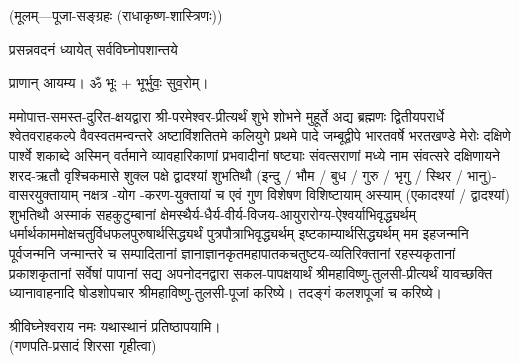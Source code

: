 
\centerline{\small{(मूलम्—पूजा-सङ्ग्रहः (राधाकृष्ण-शास्त्रिणः))}}




{प्रसन्नवदनं ध्यायेत् सर्वविघ्नोपशान्तये}
 
प्राणान् आयम्य। ॐ भूः + भूर्भुवः॒ सुव॒रोम्।


ममोपात्त-समस्त-दुरित-क्षयद्वारा श्री-परमेश्वर-प्रीत्यर्थं शुभे शोभने मुहूर्ते अद्य ब्रह्मणः
द्वितीयपरार्धे श्वेतवराहकल्पे वैवस्वतमन्वन्तरे अष्टाविंशतितमे कलियुगे प्रथमे पादे
जम्बूद्वीपे भारतवर्षे भरतखण्डे मेरोः दक्षिणे पार्श्वे शकाब्दे अस्मिन् वर्तमाने व्यावहारिकाणां प्रभवादीनां षष्ट्याः संवत्सराणां मध्ये \blank{} नाम संवत्सरे दक्षिणायने
शरद-ऋतौ वृश्चिकमासे शुक्ल पक्षे द्वादश्यां शुभतिथौ
(इन्दु / भौम / बुध / गुरु / भृगु / स्थिर / भानु)-वासरयुक्तायाम्
\blank{} नक्षत्र \blank{}-योग \blank-करण-युक्तायां च एवं गुण विशेषण विशिष्टायाम्
अस्याम् (एकादश्यां / द्वादश्यां) शुभतिथौ
अस्माकं सहकुटुम्बानां क्षेमस्थैर्य-धैर्य-वीर्य-विजय-आयुरारोग्य-ऐश्वर्याभिवृद्ध्यर्थम्
 धर्मार्थकाममोक्ष\-चतुर्विधफलपुरुषार्थसिद्ध्यर्थं पुत्रपौत्राभि\-वृद्ध्यर्थम् इष्टकाम्यार्थसिद्ध्यर्थम्
मम इहजन्मनि पूर्वजन्मनि जन्मान्तरे च सम्पादितानां ज्ञानाज्ञानकृतमहा\-पातकचतुष्टय-व्यतिरिक्तानां रहस्यकृतानां प्रकाशकृतानां सर्वेषां पापानां सद्य अपनोदनद्वारा सकल-पापक्षयार्थं श्रीमहाविष्णु-तुलसी-प्रीत्यर्थं यावच्छक्ति ध्यानावाहनादि
षोडशोपचार श्रीमहाविष्णु-तुलसी-पूजां करिष्ये। तदङ्गं कलशपूजां च करिष्ये।


श्रीविघ्नेश्वराय नमः यथास्थानं प्रतिष्ठापयामि।\\
(गणपति-प्रसादं शिरसा गृहीत्वा)













